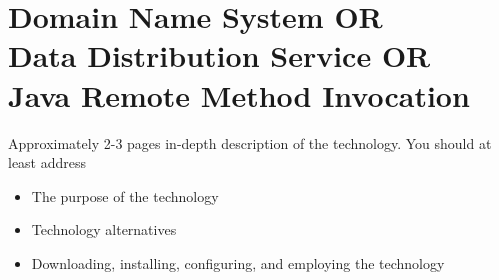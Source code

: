 \documentclass[Main]{subfiles}
\begin{document}
\chapter{Domain Name System OR\\
Data Distribution Service OR\\
Java Remote Method Invocation}
Approximately 2-3 pages in-depth description of the technology. You
should at least address
\begin{itemize}
\item The purpose of the technology
\item Technology alternatives
\item Downloading, installing, configuring, and employing the technology
\end{itemize}
\end{document}
